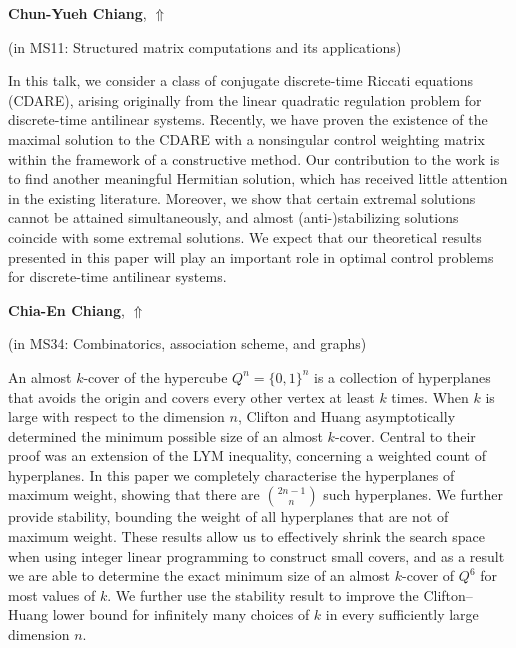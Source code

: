 \documentclass[ILAS2025-program.tex]{subfiles}
\begin{document}
\hypertarget{down0268}{}\begin{ilasabstract}
    
\textbf{Chun-Yueh Chiang},  \hfill \hyperlink{up0268}{$\Uparrow$}
    
    
(in {\color{mstitle}MS11: Structured matrix computations and its applications})
        
\mtskip
    In this talk, we consider a class of conjugate discrete-time Riccati equations (CDARE), arising originally
from the linear quadratic regulation problem for discrete-time antilinear systems. Recently, we have proven
the existence of the maximal solution to the CDARE with a nonsingular control weighting matrix within
the framework of a constructive method. Our contribution to the work is to find another meaningful
Hermitian solution, which has received little attention in the existing literature. Moreover, we show that
certain extremal solutions cannot be attained simultaneously, and almost (anti-)stabilizing solutions coincide
with some extremal solutions. We expect that our theoretical results presented in this paper will play an
important role in optimal control problems for discrete-time antilinear systems.

\end{ilasabstract}
    

\hypertarget{down0323}{}\begin{ilasabstract}
    
\textbf{Chia-En Chiang},  \hfill \hyperlink{up0323}{$\Uparrow$}
    
    
(in {\color{mstitle}MS34: Combinatorics, association scheme, and graphs})
        
\mtskip
    An almost $k$-cover of the hypercube $Q^n = \{0,1\}^n$ is a collection of hyperplanes that avoids the origin and covers every other vertex at least $k$ times. When $k$ is large with respect to the dimension $n$, Clifton and Huang asymptotically determined the minimum possible size of an almost $k$-cover. Central to their proof was an extension of the LYM inequality, concerning a weighted count of hyperplanes. In this paper we completely characterise the hyperplanes of maximum weight, showing that there are $\binom{2n-1}{n}$ such hyperplanes. We further provide stability, bounding the weight of all hyperplanes that are not of maximum weight. These results allow us to effectively shrink the search space when using integer linear programming to construct small covers, and as a result we are able to determine the exact minimum size of an almost $k$-cover of $Q^6$ for most values of $k$. We further use the stability result to improve the Clifton--Huang lower bound for infinitely many choices of $k$ in every sufficiently large dimension $n$.

\end{ilasabstract}
    
\end{document}
